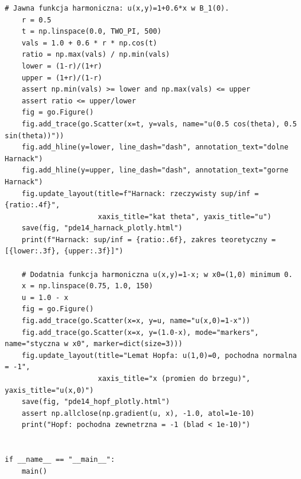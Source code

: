 \begin{lstlisting}[style=pythonpde,caption={Jądro Poissona, nierówność Harnacka i lemat Hopfa (Plotly)},label={code:pde14-plotly}]
    # Jawna funkcja harmoniczna: u(x,y)=1+0.6*x w B_1(0).
    r = 0.5
    t = np.linspace(0.0, TWO_PI, 500)
    vals = 1.0 + 0.6 * r * np.cos(t)
    ratio = np.max(vals) / np.min(vals)
    lower = (1-r)/(1+r)
    upper = (1+r)/(1-r)
    assert np.min(vals) >= lower and np.max(vals) <= upper
    assert ratio <= upper/lower
    fig = go.Figure()
    fig.add_trace(go.Scatter(x=t, y=vals, name="u(0.5 cos(theta), 0.5 sin(theta))"))
    fig.add_hline(y=lower, line_dash="dash", annotation_text="dolne Harnack")
    fig.add_hline(y=upper, line_dash="dash", annotation_text="gorne Harnack")
    fig.update_layout(title=f"Harnack: rzeczywisty sup/inf = {ratio:.4f}",
                      xaxis_title="kat theta", yaxis_title="u")
    save(fig, "pde14_harnack_plotly.html")
    print(f"Harnack: sup/inf = {ratio:.6f}, zakres teoretyczny = [{lower:.3f}, {upper:.3f}]")

    # Dodatnia funkcja harmoniczna u(x,y)=1-x; w x0=(1,0) minimum 0.
    x = np.linspace(0.75, 1.0, 150)
    u = 1.0 - x
    fig = go.Figure()
    fig.add_trace(go.Scatter(x=x, y=u, name="u(x,0)=1-x"))
    fig.add_trace(go.Scatter(x=x, y=(1.0-x), mode="markers", name="styczna w x0", marker=dict(size=3)))
    fig.update_layout(title="Lemat Hopfa: u(1,0)=0, pochodna normalna = -1",
                      xaxis_title="x (promien do brzegu)", yaxis_title="u(x,0)")
    save(fig, "pde14_hopf_plotly.html")
    assert np.allclose(np.gradient(u, x), -1.0, atol=1e-10)
    print("Hopf: pochodna zewnetrzna = -1 (blad < 1e-10)")


if __name__ == "__main__":
    main()
\end{lstlisting}

